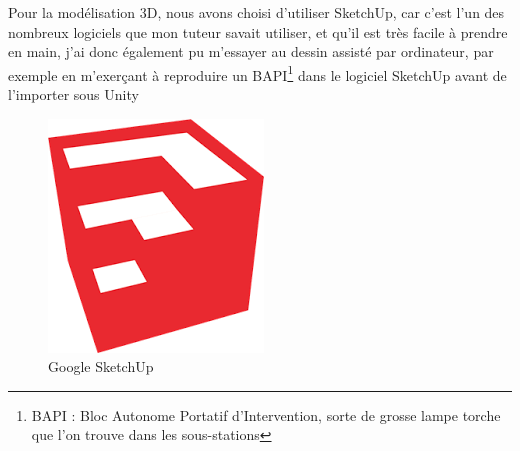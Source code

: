 \documentclass[a4paper]{article}
\begin{document}
    \vfill
    \newpage

    \vfill
    Pour la modélisation 3D, nous avons choisi d'utiliser SketchUp, car c'est l'un des nombreux logiciels que mon tuteur savait utiliser, et qu'il est très facile à prendre en main, j'ai donc également pu m'essayer au dessin assisté par ordinateur, par exemple en m'exerçant à reproduire un BAPI\footnote{BAPI : Bloc Autonome Portatif d'Intervention, sorte de grosse lampe torche que l'on trouve dans les sous-stations} dans le logiciel SketchUp avant de l'importer sous Unity \\

    \vspace{20pt}
    
    \begin{figure}[H]
        \centering
        \includegraphics[scale=0.5]{img/Logo-skp}
        \caption{Google SketchUp}
    \end{figure}

    \vspace{20pt}
\end{document}
